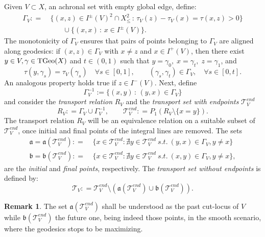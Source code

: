 \documentclass[a4paper,10pt]{article}
\newcommand{\T}{\mathcal{T}}
\newcommand{\TGeo}{{\rm TGeo}}
\newcommand{\fa}{\mathfrak{a}}
\newcommand{\fb}{\mathfrak{b}}
\theoremstyle{plain}
\theoremstyle{definition}
\newtheorem{remark}[lemma]{Remark}
\numberwithin{equation}{section}
\begin{document}
Given $V\subset X$,  an achronal set with empty global edge, define:
%
\begin{equation}\label{E:GammaV}
\begin{split}
\Gamma_{V} : = &~ \{ (x,z) \in I^{\pm}(V)^{2} \cap X^{2}_{\leq} \, \colon \, 
 \tau_{V}(z) - \tau_{V}(x)  = \tau(x,z)>0 \} \\ 
 &\qquad \cup \{(x,x) \,:\, x\in I^{\pm}(V)\}.
 \end{split}
\end{equation}
%
The monotonicity of $\Gamma_{V}$ ensures that pairs of points belonging to $\Gamma_{V}$ are aligned along geodesics: if $(x,z) \in \Gamma_{V}$ with $x \neq z$ and $x \in I^{+}(V)$, then
there exist $y \in V, \gamma \in \TGeo(X)$ and $t \in (0,1)$ such that $y=\gamma_0, \;x = \gamma_{t}, \; z=\gamma_1$, and
%
$$ \tau(y,\gamma_{s}) = \tau_{V}(\gamma_{s})  \quad \forall s\in [0,1], \qquad
(\gamma_{s},\gamma_{t}) \in \Gamma_{V},  \quad \forall s\in [0,t].
$$
% 
An analogous property holds true if $z \in I^{-}(V)$. Next, define 
$$\Gamma_{V}^{-1}:=\{(x,y)\,:\, (y,x)\in \Gamma_{V}\}$$
 and consider the \emph{transport relation} $R_{V}$ and 
the \emph{transport set with endpoints} $\T_{V}^{end}$
%
\begin{equation}\label{E:transport}
R_{V} : = \Gamma_{V} \cup \Gamma_{V}^{-1}, \qquad 
\T_{V}^{end} : = P_{1}(R_{V}\setminus \{ x = y \}).
\end{equation}
%
The transport relation $R_{V}$ will be an equivalence relation on a suitable subset of 
$\T_{V}^{end}$, once initial and final points of the integral lines are removed. The sets
%
\begin{equation}\label{eq:defendpoints}
\begin{split}
\fa = \fa(\T_{V}^{end}) : =&~ \{ x \in \T_{V}^{end} \colon \nexists y \in \T_{V}^{end} \ s.t. \ (y,x) \in \Gamma_{V}, y\neq x \} \\
\fb = \fb(\T_{V}^{end}) : =&~ \{ x \in \T_{V}^{end} \colon \nexists y \in \T_{V}^{end} \ s.t. \ (x,y) \in \Gamma_{V}, y\neq x \},
\end{split}
\end{equation}
%
are the \emph{initial} and \emph{final points}, respectively. 
The \emph{transport set without endpoints} is defined by:
%
\begin{equation}\label{eq:defTV}
\T_{V} : = \T_{V}^{end} \setminus (\fa(\T_{V}^{end}) \cup \fb(\T_{V}^{end})).
\end{equation}

\begin{remark}\label{R:cutlocus}
The set $\fa(\T_{V}^{end})$ shall be understood as the past cut-locus of $V$ while 
$\fb(\T_{V}^{end})$ the future one, being indeed those points, in the smooth scenario, where the geodesics stops to be maximizing. 
\end{remark}
\end{document}

